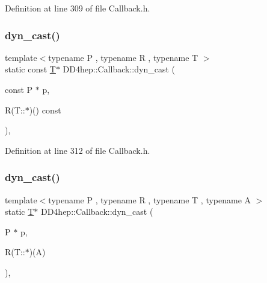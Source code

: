 Definition at line 309 of file Callback.\+h.

\hypertarget{class_d_d4hep_1_1_callback_ada8b9e61abfed4f65dafeb87de834421}{}\label{class_d_d4hep_1_1_callback_ada8b9e61abfed4f65dafeb87de834421} 
\subsubsection{\texorpdfstring{dyn\+\_\+cast()}{dyn\_cast()}\hspace{0.1cm}{\footnotesize\ttfamily [2/4]}}
{\footnotesize\ttfamily template$<$typename P , typename R , typename T $>$ \\
static const \hyperlink{class_t}{T}$\ast$ D\+D4hep\+::\+Callback\+::dyn\+\_\+cast (\begin{DoxyParamCaption}\item[{const P $\ast$}]{p,  }\item[{R(T\+::$\ast$)()}]{const }\end{DoxyParamCaption})\hspace{0.3cm}{\ttfamily [inline]}, {\ttfamily [static]}}



Definition at line 312 of file Callback.\+h.

\hypertarget{class_d_d4hep_1_1_callback_a0c20bd2390e3d4cd2c24a2228d71f6e9}{}\label{class_d_d4hep_1_1_callback_a0c20bd2390e3d4cd2c24a2228d71f6e9} 
\subsubsection{\texorpdfstring{dyn\+\_\+cast()}{dyn\_cast()}\hspace{0.1cm}{\footnotesize\ttfamily [3/4]}}
{\footnotesize\ttfamily template$<$typename P , typename R , typename T , typename A $>$ \\
static \hyperlink{class_t}{T}$\ast$ D\+D4hep\+::\+Callback\+::dyn\+\_\+cast (\begin{DoxyParamCaption}\item[{P $\ast$}]{p,  }\item[{R(T\+::$\ast$)(A)}]{ }\end{DoxyParamCaption})\hspace{0.3cm}{\ttfamily [inline]}, {\ttfamily [static]}}



